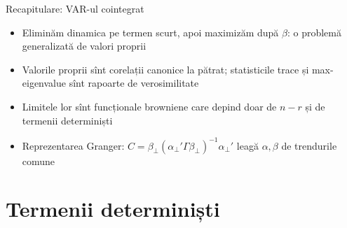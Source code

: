 \begin{frame}{Recapitulare: VAR-ul cointegrat}
\itemsize{\small}
\begin{itemize}
    \item Eliminăm dinamica pe termen scurt, apoi maximizăm după $\beta$: o problemă generalizată de valori proprii
    \item Valorile proprii sînt corelații canonice la pătrat; statisticile trace și max-eigenvalue sînt rapoarte de verosimilitate
    \item Limitele lor sînt funcționale browniene care depind doar de $n - r$ și de termenii determiniști
    \item Reprezentarea Granger: $C = \beta_\perp(\alpha_\perp'\Gamma\beta_\perp)^{-1}\alpha_\perp'$ leagă $\alpha, \beta$ de trendurile comune
\end{itemize}
\end{frame}


\section{Termenii determiniști}

